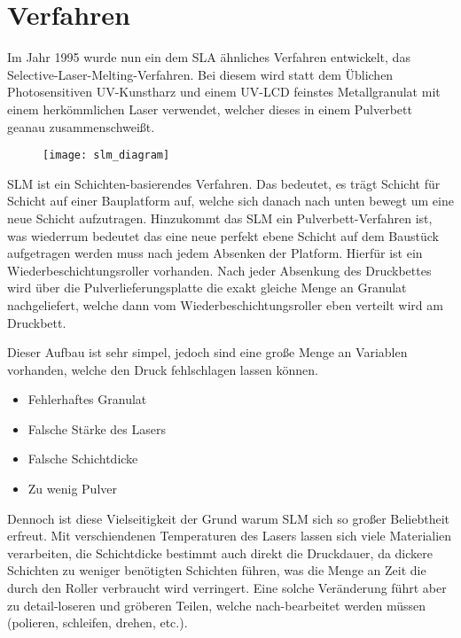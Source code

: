 \documentclass[main.tex]{subfiles}
\begin{document}
\section{Verfahren}
Im Jahr 1995 wurde nun ein dem SLA ähnliches Verfahren entwickelt, das Selective-Laser-Melting-Verfahren. Bei diesem wird statt dem Üblichen Photosensitiven UV-Kunstharz und einem UV-LCD feinstes Metallgranulat mit einem herkömmlichen Laser verwendet, welcher dieses in einem Pulverbett geanau zusammenschweißt. \parencite{3FAKTUR_1}
\begin{figure}[H]
\begin{center}
	\texttt{[image: slm\_diagram]}
	\label{img:slm_diagram}
\end{center}
\end{figure}	
SLM ist ein Schichten-basierendes Verfahren. Das bedeutet, es trägt Schicht für Schicht auf
einer Bauplatform auf, welche sich danach nach unten bewegt um eine neue Schicht aufzutragen. 
Hinzukommt das SLM ein Pulverbett-Verfahren ist, was wiederrum bedeutet das eine neue perfekt ebene Schicht auf dem Baustück aufgetragen werden muss nach jedem Absenken der Platform.
Hierfür ist ein Wiederbeschichtungsroller vorhanden. Nach jeder Absenkung des Druckbettes wird über die Pulverlieferungsplatte die exakt gleiche Menge an Granulat nachgeliefert, welche dann vom Wiederbeschichtungsroller eben verteilt wird am Druckbett. 

Dieser Aufbau ist sehr simpel, jedoch sind eine große Menge an Variablen vorhanden, welche den Druck fehlschlagen lassen können.
\begin{itemize}
\item Fehlerhaftes Granulat
\item Falsche Stärke des Lasers
\item Falsche Schichtdicke
\item Zu wenig Pulver
\end{itemize}
Dennoch ist diese Vielseitigkeit der Grund warum SLM sich so großer Beliebtheit erfreut. Mit verschiendenen Temperaturen des Lasers lassen sich viele Materialien verarbeiten, die Schichtdicke bestimmt auch direkt die Druckdauer, da dickere Schichten zu weniger benötigten Schichten führen, was die Menge an Zeit die durch den Roller verbraucht wird verringert.
Eine solche Veränderung führt aber zu detail-loseren und gröberen Teilen, welche  nach-bearbeitet werden müssen (polieren, schleifen, drehen, etc.). 
\end{document}
